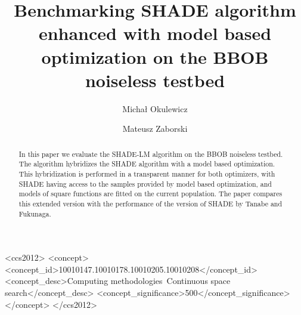 \documentclass[sigconf]{acmart}
\begin{document}
\title{Benchmarking SHADE algorithm enhanced with model based optimization on the BBOB noiseless testbed}
\renewcommand{\shorttitle}{SHADE algorithm enhanced with model based optimization on BBOB}

\author{Michał Okulewicz}
%
\author{Mateusz Zaborski}

\renewcommand{\shortauthors}{Firstname Lastname et. al.}


\begin{abstract}
 In this paper we evaluate the SHADE-LM algorithm on the BBOB noiseless testbed.
 The algorithm hybridizes the SHADE algorithm with a model based optimization.
 This hybridization is performed in a transparent manner for both optimizers,
 with SHADE having access to the samples provided by model based optimization,
 and models of square functions are fitted on the current population.
 The paper compares this extended version with the performance of the 
 version of SHADE by Tanabe and Fukunaga.
\end{abstract}


%
%
\begin{CCSXML}
<ccs2012>
<concept>
<concept_id>10010147.10010178.10010205.10010208</concept_id>
<concept_desc>Computing methodologies~Continuous space search</concept_desc>
<concept_significance>500</concept_significance>
</concept>
</ccs2012>
\end{CCSXML}



\end{document}
